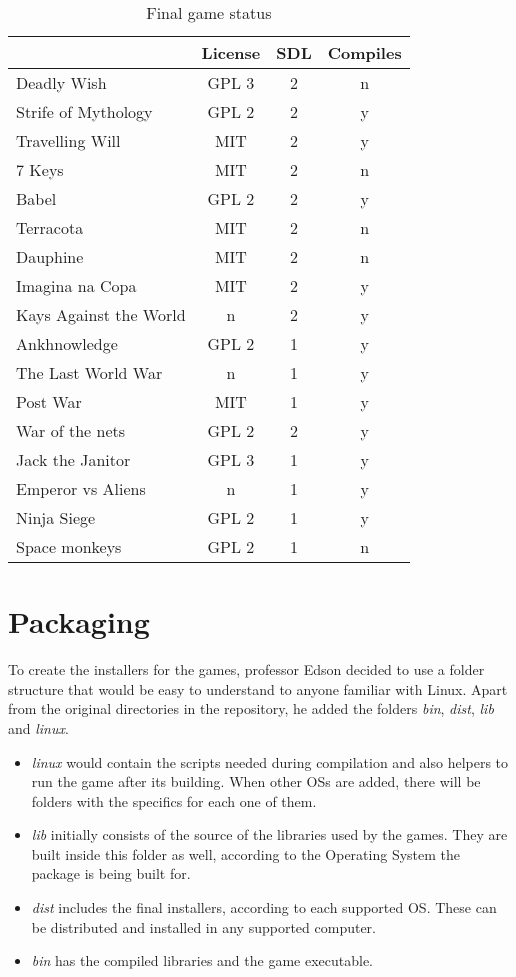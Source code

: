 \begin{table}[h!]
\centering
\caption{Final game status}
\label{tab:final_games}
\begin{tabular}{lccc}
\toprule
\textbf{} & \multicolumn{1}{l}{\textbf{License}} & \multicolumn{1}{l}{\textbf{SDL}} & \multicolumn{1}{l}{\textbf{Compiles}} \\
\midrule
Deadly Wish & GPL 3 & 2 & n \\
Strife of Mythology & GPL 2 & 2 & y \\
Travelling Will & MIT & 2 & y \\
7 Keys & MIT & 2 & n \\
Babel & GPL 2 & 2 & y \\
Terracota & MIT & 2 & n \\
Dauphine & MIT & 2 & n \\
Imagina na Copa & MIT & 2 & y \\
Kays Against the World & n & 2 & y \\
Ankhnowledge & GPL 2 & 1 & y \\
The Last World War & n & 1 & y \\
Post War & MIT & 1 & y \\
War of the nets & GPL 2 & 2 & y \\
Jack the Janitor & GPL 3 & 1 & y \\
Emperor vs Aliens & n & 1 & y \\
Ninja Siege & GPL 2 & 1 & y \\
Space monkeys & GPL 2 & 1 & n \\
\bottomrule
\end{tabular}
\end{table}


\section{Packaging}
\label{sec:packaging}

To create the installers for the games, professor Edson decided to use a folder structure that would be easy to understand to anyone familiar with Linux. Apart from the original directories in the repository, he added the folders \textit{bin}, \textit{dist}, \textit{lib} and \textit{linux}.

\begin{itemize}
\item \textit{linux} would contain the scripts needed during compilation and also helpers to run the game after its building. When other OSs are added, there will be folders with the specifics for each one of them.
\item \textit{lib} initially consists of the source of the libraries used by the games. They are built inside this folder as well, according to the Operating System the package is being built for.
\item \textit{dist} includes the final installers, according to each supported OS. These can be distributed and installed in any supported computer.
\item \textit{bin} has the compiled libraries and the game executable.

\end{itemize}

